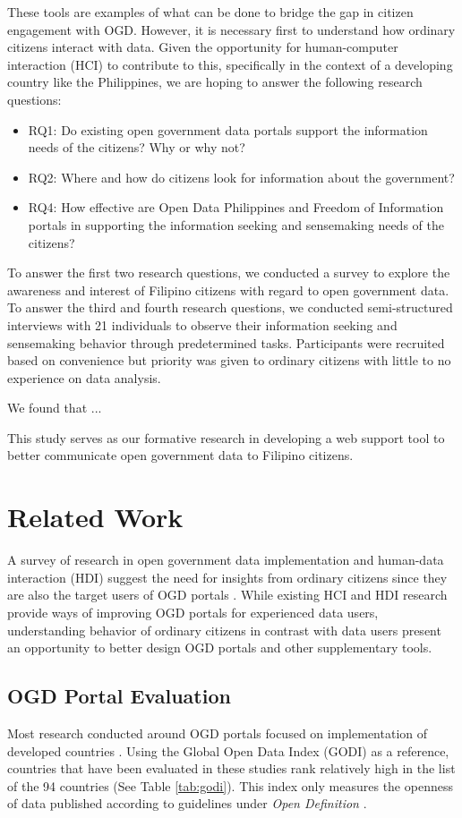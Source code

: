 \documentclass{sigchi}
\begin{document}
These tools are examples of what can be done to bridge the gap in citizen engagement with OGD. However, it is necessary first to understand how ordinary citizens interact with data. Given the opportunity for human-computer interaction (HCI) to contribute to this, specifically in the context of a developing country like the Philippines, we are hoping to answer the following research questions:
\begin{itemize}
    \item RQ1: Do existing open government data portals support the information needs of the citizens? Why or why not?
    \item RQ2: Where and how do citizens look for information about the government?
    \item RQ4: How effective are Open Data Philippines and Freedom of Information portals in supporting the information seeking and sensemaking needs of the citizens?
\end{itemize}

To answer the first two research questions, we conducted a survey to explore the awareness and interest of Filipino citizens with regard to open government data. To answer the third and fourth research questions, we conducted semi-structured interviews with 21 individuals to observe their information seeking and sensemaking behavior through predetermined tasks. Participants were recruited based on convenience but priority was given to ordinary citizens with little to no experience on data analysis.

We found that ...

This study serves as our formative research in developing a web support tool to better communicate open government data to Filipino citizens.


\section{Related Work}
A survey of research in open government data implementation and human-data interaction (HDI) suggest the need for insights from ordinary citizens since they are also the target users of OGD portals \cite{warwick2017}. While existing HCI and HDI research provide ways of improving OGD portals for experienced data users, understanding behavior of ordinary citizens in contrast with data users present an opportunity to better design OGD portals and other supplementary tools. 

\subsection{OGD Portal Evaluation}
Most research conducted around OGD portals focused on implementation of developed countries \cite{kacprzak2019characterising, klimek2019dcat, koesten2019collaborative,Parycek2014}. Using the Global Open Data Index (GODI) as a reference, countries that have been evaluated in these studies rank relatively high in the list of the 94 countries (See Table \ref{tab:godi})\cite{godimetric2016}. This index only measures the openness of data published according to guidelines under \textit{Open Definition} \cite{godimetric2016}. 
\end{document}
